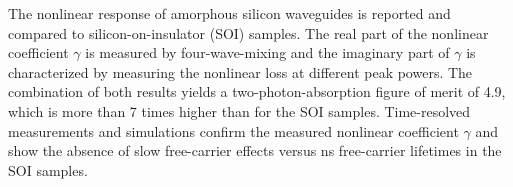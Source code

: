 \documentclass[10pt,letterpaper]{article}
\begin{document}
The nonlinear response of amorphous silicon waveguides is reported and compared to silicon-on-insulator (SOI) samples. The real part of the nonlinear coefficient $\gamma$ is measured by four-wave-mixing and the imaginary part of $\gamma$ is characterized by measuring the nonlinear loss at different peak powers. The combination of both results yields a two-photon-absorption figure of merit of 4.9, which is more than 7 times higher than for the SOI samples. Time-resolved measurements and simulations confirm the measured nonlinear coefficient $\gamma$ and show the absence of slow free-carrier effects versus ns free-carrier lifetimes in the SOI samples.
\end{document}
